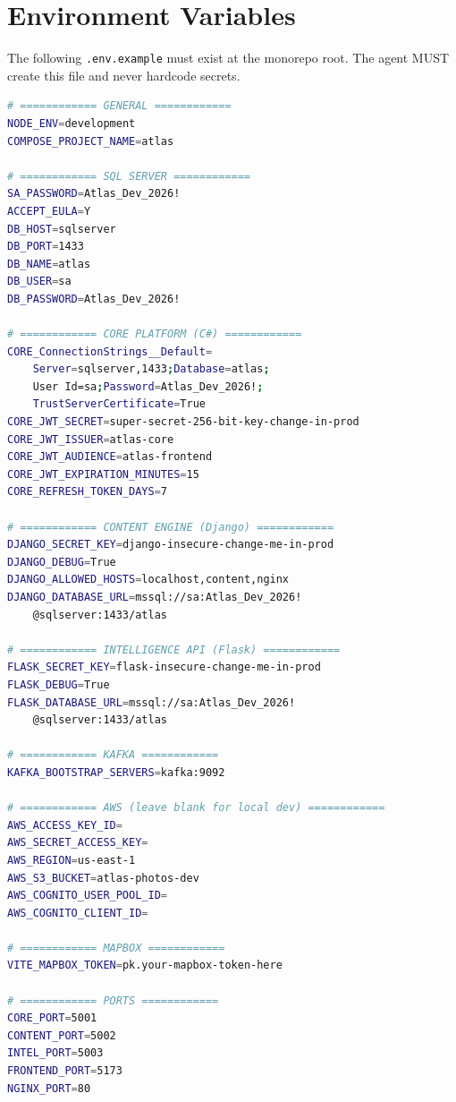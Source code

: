 \documentclass[12pt,letterpaper]{article}
\begin{document}
\newpage

\section{Environment Variables}

The following \texttt{.env.example} must exist at the monorepo root. The agent MUST create this file and never hardcode secrets.

\begin{lstlisting}[style=code,language=bash]
# ============ GENERAL ============
NODE_ENV=development
COMPOSE_PROJECT_NAME=atlas

# ============ SQL SERVER ============
SA_PASSWORD=Atlas_Dev_2026!
ACCEPT_EULA=Y
DB_HOST=sqlserver
DB_PORT=1433
DB_NAME=atlas
DB_USER=sa
DB_PASSWORD=Atlas_Dev_2026!

# ============ CORE PLATFORM (C#) ============
CORE_ConnectionStrings__Default=
    Server=sqlserver,1433;Database=atlas;
    User Id=sa;Password=Atlas_Dev_2026!;
    TrustServerCertificate=True
CORE_JWT_SECRET=super-secret-256-bit-key-change-in-prod
CORE_JWT_ISSUER=atlas-core
CORE_JWT_AUDIENCE=atlas-frontend
CORE_JWT_EXPIRATION_MINUTES=15
CORE_REFRESH_TOKEN_DAYS=7

# ============ CONTENT ENGINE (Django) ============
DJANGO_SECRET_KEY=django-insecure-change-me-in-prod
DJANGO_DEBUG=True
DJANGO_ALLOWED_HOSTS=localhost,content,nginx
DJANGO_DATABASE_URL=mssql://sa:Atlas_Dev_2026!
    @sqlserver:1433/atlas

# ============ INTELLIGENCE API (Flask) ============
FLASK_SECRET_KEY=flask-insecure-change-me-in-prod
FLASK_DEBUG=True
FLASK_DATABASE_URL=mssql://sa:Atlas_Dev_2026!
    @sqlserver:1433/atlas

# ============ KAFKA ============
KAFKA_BOOTSTRAP_SERVERS=kafka:9092

# ============ AWS (leave blank for local dev) ============
AWS_ACCESS_KEY_ID=
AWS_SECRET_ACCESS_KEY=
AWS_REGION=us-east-1
AWS_S3_BUCKET=atlas-photos-dev
AWS_COGNITO_USER_POOL_ID=
AWS_COGNITO_CLIENT_ID=

# ============ MAPBOX ============
VITE_MAPBOX_TOKEN=pk.your-mapbox-token-here

# ============ PORTS ============
CORE_PORT=5001
CONTENT_PORT=5002
INTEL_PORT=5003
FRONTEND_PORT=5173
NGINX_PORT=80
\end{lstlisting}
\end{document}
